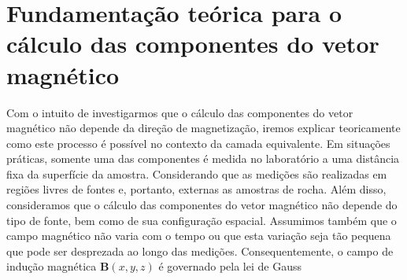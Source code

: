 %

\section{Fundamentação teórica para o cálculo das componentes do vetor magnético}

Com o intuito de investigarmos que o cálculo das componentes do vetor magnético não depende da direção de magnetização, iremos explicar teoricamente como este processo é possível no contexto da camada equivalente. Em situações práticas, somente uma das componentes é medida no laboratório a uma distância fixa da superfície da amostra. Considerando que as medições são realizadas em regiões livres de fontes e, portanto, externas as amostras de rocha. Além disso, consideramos que o cálculo das componentes do vetor magnético não depende do tipo de fonte, bem como de sua configuração espacial. Assumimos também que o campo magnético não varia com o tempo ou que esta variação seja tão pequena que pode ser desprezada ao longo das medições. Consequentemente, o campo de indução magnética $\mathbf{B}(x,y,z)$ é governado pela lei de Gauss

